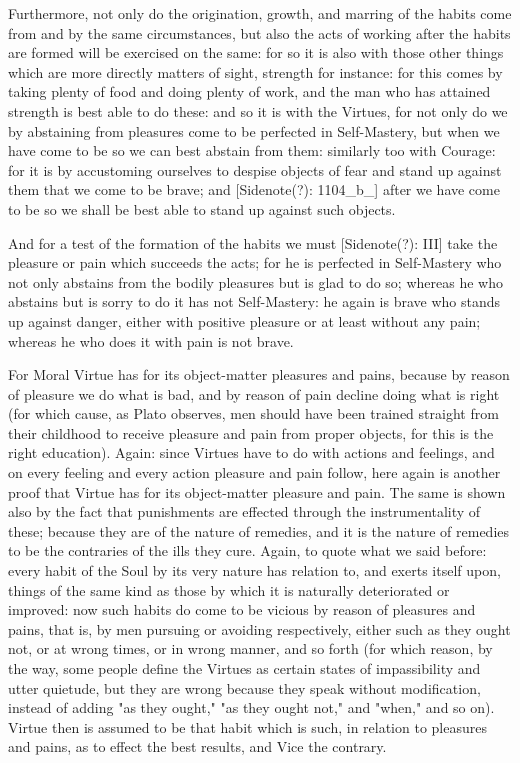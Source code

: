 Furthermore, not only do the origination, growth, and marring of the
habits come from and by the same circumstances, but also the acts of
working after the habits are formed will be exercised on the same: for
so it is also with those other things which are more directly matters of
sight, strength for instance: for this comes by taking plenty of food
and doing plenty of work, and the man who has attained strength is best
able to do these: and so it is with the Virtues, for not only do we by
abstaining from pleasures come to be perfected in Self-Mastery, but when
we have come to be so we can best abstain from them: similarly too with
Courage: for it is by accustoming ourselves to despise objects of fear
and stand up against them that we come to be brave; and [Sidenote(?):
1104_b_] after we have come to be so we shall be best able to stand up
against such objects.

And for a test of the formation of the habits we must [Sidenote(?): III]
take the pleasure or pain which succeeds the acts; for he is perfected
in Self-Mastery who not only abstains from the bodily pleasures but is
glad to do so; whereas he who abstains but is sorry to do it has not
Self-Mastery: he again is brave who stands up against danger, either
with positive pleasure or at least without any pain; whereas he who does
it with pain is not brave.

For Moral Virtue has for its object-matter pleasures and pains, because
by reason of pleasure we do what is bad, and by reason of pain decline
doing what is right (for which cause, as Plato observes, men should have
been trained straight from their childhood to receive pleasure and pain
from proper objects, for this is the right education). Again: since
Virtues have to do with actions and feelings, and on every feeling and
every action pleasure and pain follow, here again is another proof that
Virtue has for its object-matter pleasure and pain. The same is
shown also by the fact that punishments are effected through the
instrumentality of these; because they are of the nature of remedies,
and it is the nature of remedies to be the contraries of the ills they
cure. Again, to quote what we said before: every habit of the Soul by
its very nature has relation to, and exerts itself upon, things of the
same kind as those by which it is naturally deteriorated or improved:
now such habits do come to be vicious by reason of pleasures and pains,
that is, by men pursuing or avoiding respectively, either such as they
ought not, or at wrong times, or in wrong manner, and so forth (for
which reason, by the way, some people define the Virtues as certain
states of impassibility and utter quietude, but they are wrong because
they speak without modification, instead of adding "as they ought," "as
they ought not," and "when," and so on). Virtue then is assumed to be
that habit which is such, in relation to pleasures and pains, as to
effect the best results, and Vice the contrary.

